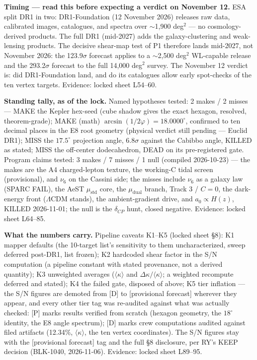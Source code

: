 \documentclass{alienfolio}
\begin{document}
\noindent\textbf{Timing --- read this before expecting a verdict on November 12.} ESA split DR1 in two: DR1-Foundation (12 November 2026) releases raw data, calibrated images, catalogues, and spectra over $\sim$1,900 deg$^2$ --- no cosmology-derived products. The full DR1 (mid-2027) adds the galaxy-clustering and weak-lensing products. The decisive shear-map test of P1 therefore lands mid-2027, not November 2026: the 123.9$\sigma$ forecast applies to a $\sim$2,500 deg$^2$ WL-capable release and the 293.2$\sigma$ forecast to the full 14,000 deg$^2$ survey. The November 12 verdict is: did DR1-Foundation land, and do its catalogues allow early spot-checks of the ten vertex targets. Evidence: locked sheet L54--60.

\noindent\textbf{Standing tally, as of the lock.} Named hypotheses tested: 2 makes / 2 misses --- MAKE the Kepler hex-seed (cube shadow gives the exact hexagon, resolved, theorem-grade); MAKE (math) $\arcsin(1/2\varphi) = 18.0000^\circ$, confirmed to ten decimal places in the E8 root geometry (physical verdict still pending --- Euclid DR1); MISS the $17.5^\circ$ projection angle, 6.8$\sigma$ against the Cabibbo angle, KILLED as stated; MISS the off-center dodecahedron, DEAD on its pre-registered gate. Program claims tested: 3 makes / 7 misses / 1 null (compiled 2026-10-23) --- the makes are the A4 charged-lepton texture, the working-C tidal screen (provisional), and $\nu_6$ on the Cassini side; the misses include $\nu_6$ as a galaxy law (SPARC FAIL), the AeST $\mu_{\mathrm{std}}$ core, the $\mu_{\mathrm{dual}}$ branch, Track 3 / $C = 0$, the dark-energy front ($\Lambda$CDM stands), the ambient-gradient drive, and $a_0 \propto H(z)$, KILLED 2026-11-01; the null is the $\delta_{CP}$ hunt, closed negative. Evidence: locked sheet L64--85.

\noindent\textbf{What the numbers carry.} Pipeline caveats K1--K5 (locked sheet \S8): K1 mapper defaults (the 10-target list's sensitivity to them uncharacterized, sweep deferred post-DR1, list frozen); K2 hardcoded shear factor in the S/N computation (a pipeline constant with stated provenance, not a derived quantity); K3 unweighted averages ($\langle\kappa\rangle$ and $\Delta\kappa/\langle\kappa\rangle$; a weighted recompute deferred and stated); K4 the failed gate, disposed of above; K5 tier inflation --- the S/N figures are demoted from [D] to [provisional forecast] wherever they appear, and every other tier tag was re-audited against what was actually checked: [P] marks results verified from scratch (hexagon geometry, the $18^\circ$ identity, the E8 angle spectrum); [D] marks crew computations audited against filed artifacts (12.34\%, $\langle\kappa\rangle$, the ten vertex coordinates). The S/N figures stay with the [provisional forecast] tag and the full \S8 disclosure, per RY's KEEP decision (BLK-1040, 2026-11-06). Evidence: locked sheet L89--95.
\end{document}
